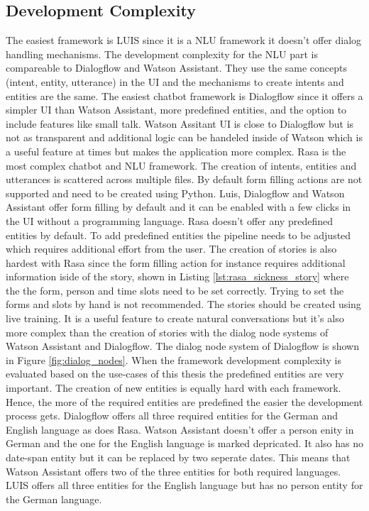 \subsection*{Development Complexity}
The easiest framework is LUIS since it is a NLU framework it doesn't
offer dialog handling mechanisms.
The development complexity for the NLU part is compareable to Dialogflow and 
Watson Assistant.
They use the same concepts (intent, entity, utterance) in the UI and the 
mechanisms to create intents and entities are the same.
The easiest chatbot framework is Dialogflow since it offers a simpler UI 
than Watson Assistant, more predefined entities, and the option to 
include features like small talk.
Watson Assitant UI is close to Dialogflow but is not as transparent 
and additional logic can be handeled inside of Watson which is a
useful feature at times but makes the application more complex.
Rasa is the most complex chatbot and NLU framework.
The creation of intents, entities and utterances is scattered across multiple files.
By default form filling actions are not supported and need to be created using Python.
Luis, Dialogflow and Watson Assistant offer form filling by default and it can be enabled with a 
few clicks in the UI without a programming language.
Rasa doesn't offer any predefined entities  by default.
To add predefined entities the pipeline needs to be adjusted which requires additional effort 
from the user.
The creation of stories is also hardest with Rasa since the form filling action for instance 
requires additional information iside of the story, shown in Listing \ref{lst:rasa_sickness_story}
where the the form, person and time slots need to be set correctly.
Trying to set the forms and slots by hand is not recommended.
The stories should be created using live training.
It is a useful feature to create natural conversations but it's also more complex than the 
creation of stories with the dialog node systems of Watson Assistant and Dialogflow.
The dialog node system of Dialogflow is shown in Figure \ref{fig:dialog_nodes}.
When the framework development complexity is evaluated based on the use-cases of this thesis 
the predefined entities are very important.
The creation of new entities is equally hard with each framework.
Hence, the more of the required entities are predefined the easier the development process gets.
Dialogflow offers all three required entities for the German and English language as does 
Rasa.
Watson Assistant doesn't offer a person enity in German and the one for the English language is marked depricated.
It also has no date-span entity but it can be replaced by two seperate dates.
This means that Watson Assistant offers two of the three entities for both required languages. 
LUIS offers all three entities for the English language but has no person entity for the German language. 



